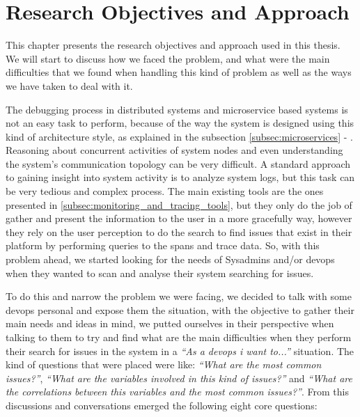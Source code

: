 \glsresetall
\chapter{Research Objectives and Approach}
\label{chap:research_objectives_and_approach}

This chapter presents the research objectives and approach used in this thesis. We will start to discuss how we faced the problem, and what were the main difficulties that we found when handling this kind of problem as well as the ways we have taken to deal with it.

The debugging process in distributed systems and microservice based systems is not an easy task to perform, because of the way the system is designed using this kind of architecture style, as explained in the subsection \ref{subsec:microservices} - . Reasoning about concurrent activities of system nodes and even understanding the system's communication topology can be very difficult. A standard approach to gaining insight into system activity is to analyze system logs, but this task can be very tedious and complex process. The main existing tools are the ones presented in \ref{subsec:monitoring_and_tracing_tools}, but they only do the job of gather and present the information to the user in a more gracefully way, however they rely on the user perception to do the search to find issues that exist in their platform by performing queries to the spans and trace data. So, with this problem ahead, we started looking for the needs of Sysadmins and/or \gls{devops} when they wanted to scan and analyse their system searching for issues.

To do this and narrow the problem we were facing, we decided to talk with some \gls{devops} personal and expose them the situation, with the objective to gather their main needs and ideas in mind, we putted ourselves in their perspective when talking to them to try and find what are the main difficulties when they perform their search for issues in the system in a \textit{``As a \gls{devops} i want to...''} situation. The kind of questions that were placed were like: \textit{``What are the most common issues?''}, \textit{``What are the variables involved in this kind of issues?''} and \textit{``What are the correlations between this variables and the most common issues?''}. From this discussions and conversations emerged the following eight core questions:

